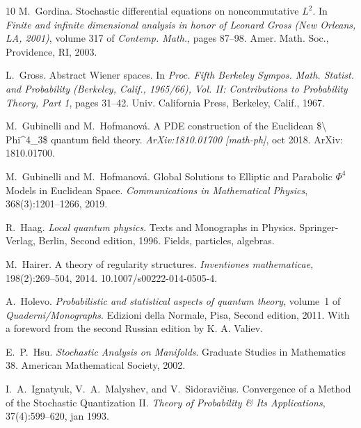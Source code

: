 \documentclass{article}
\newcommand{\tmtextit}[1]{{\itshape{#1}}}
\begin{document}
\begin{thebibliography}{10}
  M.~Gordina. {\newblock}Stochastic differential
  equations on noncommutative $L^2$. {\newblock}In \tmtextit{Finite and
  infinite dimensional analysis in honor of Leonard Gross (New Orleans, LA,
  2001)},  volume  317  of \tmtextit{Contemp. Math.},  pages  87--98. Amer.
  Math. Soc., Providence, RI, 2003.{\newblock}
  
  L.~Gross. {\newblock}Abstract Wiener spaces.
  {\newblock}In \tmtextit{Proc. Fifth Berkeley Sympos. Math. Statist. and
  Probability (Berkeley, Calif., 1965/66), Vol. II: Contributions to
  Probability Theory, Part 1},  pages  31--42. Univ. California Press,
  Berkeley, Calif., 1967.{\newblock}
  
  M.~Gubinelli  and  M.~Hofmanov{\'a}.
  {\newblock}A PDE construction of the Euclidean \$\textbackslash
  Phi{\textasciicircum}4\_3\$ quantum field theory.
  {\newblock}\tmtextit{ArXiv:1810.01700 [math-ph]}, oct 2018.
  {\newblock}ArXiv: 1810.01700.{\newblock}
  
  M.~Gubinelli  and  M.~Hofmanov{\'a}.
  {\newblock}Global Solutions to Elliptic and Parabolic $\Phi^4$ Models in
  Euclidean Space. {\newblock}\tmtextit{Communications in Mathematical
  Physics}, 368(3):1201--1266, 2019.{\newblock}
  
  R.~Haag. {\newblock}\tmtextit{Local quantum physics}.
  {\newblock}Texts and Monographs in Physics. Springer-Verlag, Berlin, Second 
  edition, 1996. {\newblock}Fields, particles, algebras.{\newblock}
  
  M.~Hairer. {\newblock}A theory of regularity
  structures. {\newblock}\tmtextit{Inventiones mathematicae}, 198(2):269--504,
  2014.
  {\newblock}\href{Https://doi.org/10.1007/s00222-014-0505-4}{}10.1007/s00222-014-0505-4.{\newblock}
  
  A.~Holevo. {\newblock}\tmtextit{Probabilistic and
  statistical aspects of quantum theory},  volume~1  of
  \tmtextit{Quaderni/Monographs}. {\newblock}Edizioni della Normale, Pisa,
  Second  edition, 2011. {\newblock}With a foreword from the second Russian
  edition by K. A. Valiev.{\newblock}
  
  E.~P.~Hsu. {\newblock}\tmtextit{Stochastic
  Analysis on Manifolds}. {\newblock}Graduate Studies in Mathematics 38.
  American Mathematical Society, 2002.{\newblock}
  
  I.~A.~Ignatyuk, V.~A.~Malyshev, and 
  V.~Sidoravi{\v c}ius. {\newblock}Convergence of a Method of the Stochastic
  Quantization II. {\newblock}\tmtextit{Theory of Probability \& Its
  Applications}, 37(4):599--620, jan 1993.{\newblock}
  

\end{thebibliography}
\end{document}
